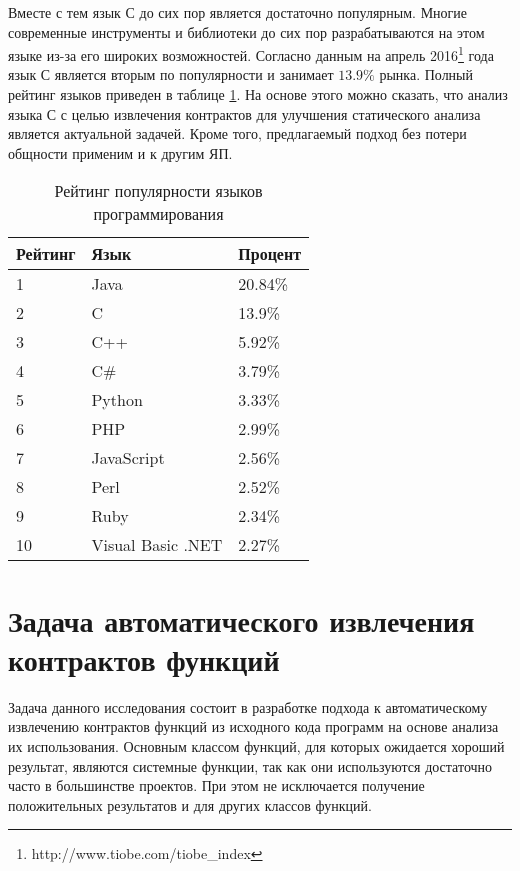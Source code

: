 Вместе с тем язык С до сих пор является достаточно популярным. Многие современные инструменты и библиотеки до сих пор разрабатываются на этом языке из-за его широких возможностей. Согласно данным на апрель 2016\footnote{http://www.tiobe.com/tiobe\_index} года язык С является вторым по популярности и занимает $13.9\%$ рынка. Полный рейтинг языков приведен в таблице \ref{table:languages}. На основе этого можно сказать, что анализ языка С с целью извлечения контрактов для улучшения статического анализа является актуальной задачей. Кроме того, предлагаемый подход без потери общности применим и к другим ЯП.

\begin{table}
	\caption{Рейтинг популярности языков программирования}
	\begin{center}
	\begin{tabular}{|l|l|l|}
	\hline 
	\textbf{Рейтинг} & \textbf{Язык} & \textbf{Процент}	\\ 
	\hline 
	1 & Java & 20.84\% \\ 
	\hline 
	2 & C & 13.9\% \\ 
	\hline 
	3 & C++ & 5.92\% \\ 
	\hline 
	4 & C\# & 3.79\% \\ 
	\hline 
	5 & Python & 3.33\% \\ 
	\hline 
	6 & PHP & 2.99\% \\ 
	\hline 
	7 & JavaScript & 2.56\% \\ 
	\hline 
	8 & Perl & 2.52\% \\ 
	\hline 
	9 & Ruby & 2.34\% \\ 
	\hline 
	10 & Visual Basic .NET & 2.27\% \\ 
	\hline 
	\end{tabular} 
	\end{center}
	\label{table:languages}
\end{table}

\section{Задача автоматического извлечения контрактов функций}
Задача данного исследования состоит в разработке подхода к автоматическому извлечению контрактов функций из исходного кода программ на основе анализа их  использования. Основным классом функций, для которых ожидается хороший результат, являются системные функции, так как они используются достаточно часто в большинстве проектов. При этом не исключается получение положительных результатов и для других классов функций. 


